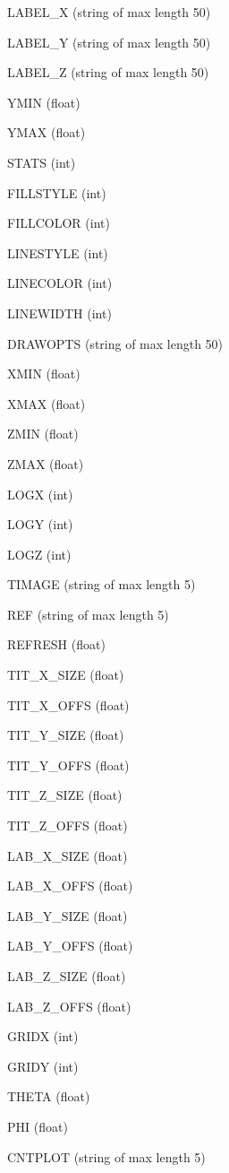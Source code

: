\item{LABEL\_X}  (string of max length 50)
\item{LABEL\_Y}  (string of max length 50)
\item{LABEL\_Z}  (string of max length 50)
\item{YMIN}  (float)
\item{YMAX}  (float)
\item{STATS}  (int)
\item{FILLSTYLE}  (int)
\item{FILLCOLOR}  (int)
\item{LINESTYLE}  (int)
\item{LINECOLOR}  (int)
\item{LINEWIDTH}  (int)
\item{DRAWOPTS}  (string of max length 50)
\item{XMIN}  (float)
\item{XMAX}  (float)
\item{ZMIN}  (float)
\item{ZMAX}  (float)
\item{LOGX}  (int)
\item{LOGY}  (int)
\item{LOGZ}  (int)
\item{TIMAGE}  (string of max length 5)
\item{REF}  (string of max length 5)
\item{REFRESH}  (float)
\item{TIT\_X\_SIZE}  (float)
\item{TIT\_X\_OFFS}  (float)
\item{TIT\_Y\_SIZE}  (float)
\item{TIT\_Y\_OFFS}  (float)
\item{TIT\_Z\_SIZE}  (float)
\item{TIT\_Z\_OFFS}  (float)
\item{LAB\_X\_SIZE}  (float)
\item{LAB\_X\_OFFS}  (float)
\item{LAB\_Y\_SIZE}  (float)
\item{LAB\_Y\_OFFS}  (float)
\item{LAB\_Z\_SIZE}  (float)
\item{LAB\_Z\_OFFS}  (float)
\item{GRIDX}  (int)
\item{GRIDY}  (int)
\item{THETA}  (float)
\item{PHI}  (float)
\item{CNTPLOT}  (string of max length 5)
